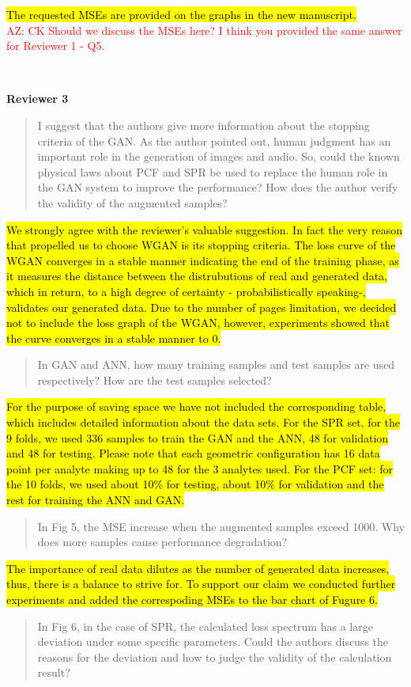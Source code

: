 \documentclass{article}
\begin{document}
	\hl{The requested MSEs are provided on the graphs in the new manuscript.} \\
	\textcolor{red}{AZ: CK Should we discuss the MSEs here? I think you provided the same answer for Reviewer 1 - Q5.}
	
	~
	
	{\bfseries\large Reviewer 3}
	
	\begin{quote}
	I suggest that the authors give more information about the stopping criteria of the GAN. As the author pointed out, human judgment has an important role in the generation of images and audio. So, could the known physical laws about PCF and SPR be used to replace the human role in the GAN system to improve the performance? How does the author verify the validity of the augmented samples?
	\end{quote}

	\hl{We strongly agree with the reviewer's valuable suggestion. In fact the very reason that propelled us to choose WGAN is its stopping criteria. The loss curve of the WGAN converges in a stable manner indicating the end of the training phase, as it measures the distance between the distrubutions of real and generated data, which in return, to a high degree of certainty - probabilistically speaking-, validates our generated data. Due to the number of pages limitation, we decided not to include the loss graph of the WGAN, however, experiments showed that the curve converges in a stable manner to 0.}	
	
	\begin{quote}
	 In GAN and ANN, how many training samples and test samples are used respectively? How are the test samples selected?
	\end{quote}
	
	\hl{For the purpose of saving space we have not included the corresponding table, which includes detailed information about the data sets. 
	For the SPR set,  for the 9 folds, we used 336 samples to train the GAN and the ANN, 48 for validation and 48 for testing. Please note that each geometric configuration has 16 data point per analyte making up to 48 for the 3 analytes used.
	For the PCF set: for the 10 folds, we used about 10$\%$ for testing, about 10$\%$ for validation and the rest for training the ANN and GAN.}	
	
	\begin{quote}
	In Fig 5, the MSE increase when the augmented samples exceed 1000. Why does more samples cause performance degradation?
	\end{quote}
	
	\hl{The importance of real data dilutes as the number of generated data increases, thus, there is a balance to strive for. To support our claim we conducted further experiments and added the correspoding MSEs to the bar chart of Fugure 6.}
	
	\begin{quote}
	In Fig 6, in the case of SPR, the calculated loss spectrum has a large deviation under some specific parameters. Could the authors discuss the reasons for the deviation and how to judge the validity of the calculation result?
	\end{quote}
	
	
\end{document}
